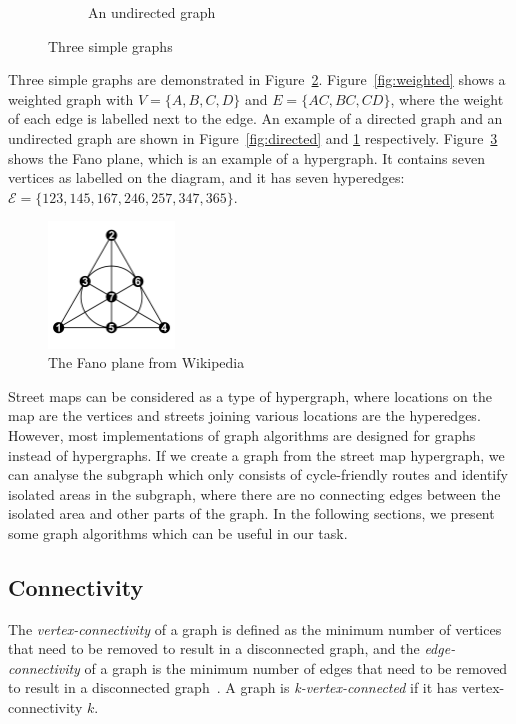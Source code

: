 \documentclass[12pt,a4paper]{report}
\begin{document}
\begin{figure}[ht]
\begin{subfigure}[ht]{0.32\textwidth}
        \caption{An undirected graph}
        \label{fig:undirected}
    \end{subfigure}
       \caption{Three simple graphs}
       \label{fig:three graphs}
\end{figure}

Three simple graphs are demonstrated in Figure~\ref{fig:three graphs}. Figure~\ref{fig:weighted} shows a weighted graph with $V = \{A, B, C, D\}$ and $E = \{AC, BC, CD\}$, where the weight of each edge is labelled next to the edge. An example of a directed graph and an undirected graph are shown in Figure~\ref{fig:directed} and \ref{fig:undirected} respectively. Figure~\ref{fig:fanoplane} shows the Fano plane, which is an example of a hypergraph. It contains seven vertices as labelled on the diagram, and it has seven hyperedges: $\mathcal{E} = \{123, 145, 167, 246, 257, 347, 365\}$.

\begin{figure}[ht]
    \centering
    \includegraphics[width=0.3\textwidth]{plan_images/fanoplane.png}
    \caption{The Fano plane from Wikipedia~\cite{WikipediaEN:fanoplane}}
    \label{fig:fanoplane}
\end{figure}

Street maps can be considered as a type of hypergraph, where locations on the map are the vertices and streets joining various locations are the hyperedges. However, most implementations of graph algorithms are designed for graphs instead of hypergraphs. If we create a graph from the street map hypergraph, we can analyse the subgraph which only consists of cycle-friendly routes and identify isolated areas in the subgraph, where there are no connecting edges between the isolated area and other parts of the graph. In the following sections, we present some graph algorithms which can be useful in our task.

\subsection{Connectivity}
The \textit{vertex-connectivity} of a graph is defined as the minimum number of vertices that need to be removed to result in a disconnected graph, and the \textit{edge-connectivity} of a graph is the minimum number of edges that need to be removed to result in a disconnected graph~\cite{buckley1990distance}. A graph is \textit{k-vertex-connected} if it has vertex-connectivity $k$.
\end{document}
